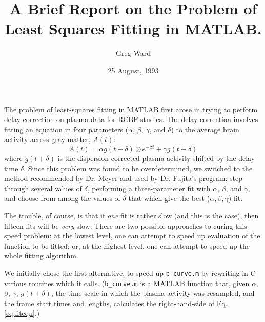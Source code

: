 
\title{A Brief Report on the Problem of Least Squares Fitting in MATLAB.}
\author{Greg Ward}
\date{25 August, 1993}



\maketitle

The problem of least-squares fitting in MATLAB first arose in trying
to perform delay correction on plasma data for RCBF studies.  The
delay correction involves fitting an equation in four parameters
($\alpha$, $\beta$, $\gamma$, and $\delta$) to the average brain
activity across gray matter, $A(t)$:
\begin{equation}
A(t) = \alpha g(t+\delta) \otimes e^{-\beta t} + \gamma g(t+\delta)
\label{eq:fiteqn}
\end{equation}
where $g(t+\delta)$ is the dispersion-corrected plasma activity
shifted by the delay time $\delta$.  Since this problem was found to
be overdetermined, we switched to the method recommended by Dr. Meyer
and used by Dr. Fujita's program: step through several values of
$\delta$, performing a three-parameter fit with $\alpha$, $\beta$, and
$\gamma$, and choose from among the values of $\delta$ that which give
the best ($\alpha, \beta, \gamma$) fit.

The trouble, of course, is that if {\em one} fit is rather slow (and
this is the case), then fifteen fits will be {\em very} slow.  There
are two possible approaches to curing this speed problem: at the
lowest level, one can attempt to speed up evaluation of the function
to be fitted; or, at the highest level, one can attempt to speed up
the whole fitting algorithm.

We initially chose the first alternative, to speed up \verb|b_curve.m|
by rewriting in C various routines which it calls.  (\verb|b_curve.m|
is a MATLAB function that, given $\alpha$, $\beta$, $\gamma$,
$g(t+\delta)$, the time-scale in which the plasma activity was
resampled, and the frame start times and lengths, calculates the
right-hand-side of Eq. \ref{eq:fiteqn}.)

